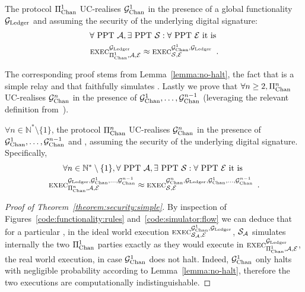 \begin{theorem}
  \label{theorem:security:simple}
  The protocol $\Pi_{\mathrm{Chan}}^{1}$ UC-realises $\mathcal{G}_{\mathrm{Chan}}^{1}$ in the presence of a
  global functionality $\mathcal{G}_{\mathrm{Ledger}}$ and assuming the security of the underlying
  digital signature:
  \begin{gather*}
    \forall \text{ PPT } \mathcal{A}, \exists \text{ PPT } \mathcal{S}: \forall
    \text{ PPT } \mathcal{E} \text{ it is }\\
    \textsc{exec}^{\mathcal{G}_{\mathrm{Ledger}}}_{\Pi_{\mathrm{Chan}}^{1}, \mathcal{A}, \mathcal{E}} \approx
    \textsc{exec}^{\mathcal{G}_{\mathrm{Chan}}^{1}, \mathcal{G}_{\mathrm{Ledger}}}_{\mathcal{S}, \mathcal{E}} \enspace.
  \end{gather*}
\end{theorem}

  The corresponding proof stems from
  Lemma~\ref{lemma:no-halt}, the fact that \fchan is a simple relay and that
  \simulator faithfully simulates \pchan. Lastly we prove that $\forall n \geq 2, \Pi_{\mathrm{Chan}}^{n}$ UC-realises $\mathcal{G}_{\mathrm{Chan}}^{n}$
  in the presence of $\mathcal{G}_{\mathrm{Chan}}^{1}, \dots, \mathcal{G}_{\mathrm{Chan}}^{n-1}$
  (leveraging the relevant definition
  from~\cite{DBLP:conf/tcc/BadertscherCHTZ20}).

\begin{theorem}
  \label{theorem:security:virtual}
  $\forall n \in \mathbb{N}^* \setminus \{1\}$, the protocol $\Pi_{\mathrm{Chan}}^{n}$
  UC-realises $\mathcal{G}_{\mathrm{Chan}}^{n}$ in the presence of $\mathcal{G}_{\mathrm{Chan}}^{1}, \dots,
  \mathcal{G}_{\mathrm{Chan}}^{n-1}$ and \ledger, assuming the security of the underlying digital
  signature. Specifically,
  \begin{gather*}
    \forall n \in \mathbb{N}^* \setminus \{1\}, \forall \text{ PPT } \mathcal{A},
    \exists \text{ PPT } \mathcal{S}: \forall \text{ PPT } \mathcal{E} \text{ it
    is } \\
    \textsc{exec}^{\mathcal{G}_{\mathrm{Ledger}}, \mathcal{G}_{\mathrm{Chan}}^{1}, \dots, \mathcal{G}_{\mathrm{Chan}}^{n-1}}_{\Pi_{\mathrm{Chan}}^{n},
    \mathcal{A}, \mathcal{E}} \approx
    \textsc{exec}^{\mathcal{G}_{\mathrm{Chan}}^{n}, \mathcal{G}_{\mathrm{Ledger}}, \mathcal{G}_{\mathrm{Chan}}^{1}, \dots,
    \mathcal{G}_{\mathrm{Chan}}^{n-1}}_{\mathcal{S}, \mathcal{E}} \enspace.
  \end{gather*}
\end{theorem}

\begin{proof}[Proof of Theorem~\ref{theorem:security:simple}]
  By inspection of Figures~\ref{code:functionality:rules}
  and~\ref{code:simulator:flow} we can deduce that for a particular
  \environment, in the ideal world execution $\textsc{exec}^{\mathcal{G}_{\mathrm{Chan}}^{1},
  \mathcal{G}_{\mathrm{Ledger}}}_{\mathcal{S}_{\mathcal{A}}, \mathcal{E}}$, $\mathcal{S}_{\mathcal{A}}$
  simulates internally the two $\Pi_{\mathrm{Chan}}^{1}$ parties exactly as they would execute in
  $\textsc{exec}^{\mathcal{G}_{\mathrm{Ledger}}}_{\Pi_{\mathrm{Chan}}^{1}, \mathcal{A}, \mathcal{E}}$, the real world
  execution, in case $\mathcal{G}_{\mathrm{Chan}}^{1}$ does not halt. Indeed, $\mathcal{G}_{\mathrm{Chan}}^{1}$ only halts with
  negligible probability according to Lemma~\ref{lemma:no-halt}, therefore the
  two executions are computationally indistinguishable.
\end{proof}

